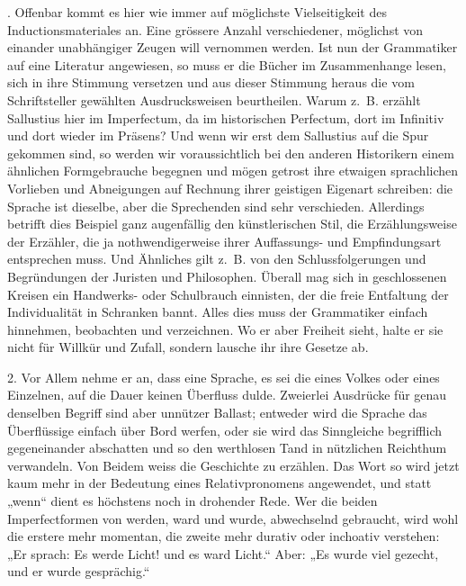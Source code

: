 . Offenbar kommt es hier wie immer auf möglichste Vielseitigkeit des Inductionsmateriales an. Eine grössere Anzahl verschiedener, möglichst von einander unabhängiger Zeugen will vernommen werden. Ist nun der Grammatiker auf eine Literatur angewiesen, so muss er die Bücher im Zusammenhange lesen, sich in ihre Stimmung versetzen und aus dieser Stimmung heraus die vom Schriftsteller gewählten Ausdrucksweisen beurtheilen. Warum z.~B. erzählt Sallustius hier im Imperfectum, da im historischen Perfectum, dort im Infinitiv und dort wieder im Präsens? Und wenn wir erst dem Sallustius auf die Spur gekommen sind, so werden wir voraussichtlich bei den anderen Historikern einem \label{sp.100} ähnlichen Formgebrauche begegnen und mögen getrost ihre etwaigen sprachlichen Vorlieben und Abneigungen auf Rechnung ihrer geistigen Eigenart schreiben: die Sprache ist dieselbe, aber die Sprechenden sind sehr verschieden. Allerdings betrifft dies Beispiel ganz augenfällig den künstlerischen Stil, die Erzählungsweise der Erzähler, die ja nothwendigerweise ihrer Auffassungs- und Empfindungsart entsprechen muss. Und \label{fp.104} Ähnliches gilt z.~B. von den Schlussfolgerungen und Begründungen der Juristen und Philosophen. Überall mag sich in geschlossenen Kreisen ein Handwerks- oder Schulbrauch einnisten, der die freie Entfaltung der Individualität in Schranken bannt. Alles dies muss der Grammatiker einfach hinnehmen, beobachten und verzeichnen. Wo er aber Freiheit sieht, halte er sie nicht für Willkür und Zufall, sondern lausche ihr ihre Gesetze ab.

2. Vor Allem nehme er an, dass eine Sprache, es sei die eines Volkes oder eines Einzelnen, auf die Dauer keinen Überfluss dulde. Zweierlei Ausdrücke für genau denselben Begriff sind aber unnützer Ballast; entweder wird die Sprache das Überflüssige einfach über Bord werfen, oder sie wird das Sinngleiche begrifflich gegeneinander abschatten und so den werthlosen Tand in nützlichen Reichthum verwandeln. Von Beidem weiss die Geschichte zu erzählen. Das Wort so wird jetzt kaum mehr in der Bedeutung eines Relativpronomens angewendet, und statt „wenn“ dient es höchstens noch in drohender Rede. Wer die beiden Imperfectformen von werden, ward und wurde, abwechselnd gebraucht, wird wohl die erstere mehr momentan, die zweite mehr durativ oder inchoativ verstehen: „Er sprach: Es werde Licht! und es ward Licht.“ Aber: „Es wurde viel gezecht, und er wurde gesprächig.“

